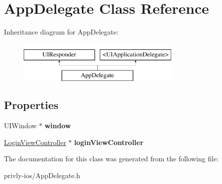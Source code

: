 \hypertarget{interface_app_delegate}{\section{App\-Delegate Class Reference}
\label{interface_app_delegate}
}
Inheritance diagram for App\-Delegate\-:\begin{figure}[H]
\begin{center}
\leavevmode
\includegraphics[height=2.000000cm]{interface_app_delegate}
\end{center}
\end{figure}
\subsection*{Properties}
\begin{DoxyCompactItemize}
\item 
\hypertarget{interface_app_delegate_acf48ac24125e688cac1a85445cd7fac2}{U\-I\-Window $\ast$ {\bfseries window}}\label{interface_app_delegate_acf48ac24125e688cac1a85445cd7fac2}

\item 
\hypertarget{interface_app_delegate_a89c5d4b85fcf7746042e1e1a67110d96}{\hyperlink{interface_login_view_controller}{Login\-View\-Controller} $\ast$ {\bfseries login\-View\-Controller}}\label{interface_app_delegate_a89c5d4b85fcf7746042e1e1a67110d96}

\end{DoxyCompactItemize}


The documentation for this class was generated from the following file\-:\begin{DoxyCompactItemize}
\item 
privly-\/ios/App\-Delegate.\-h\end{DoxyCompactItemize}

